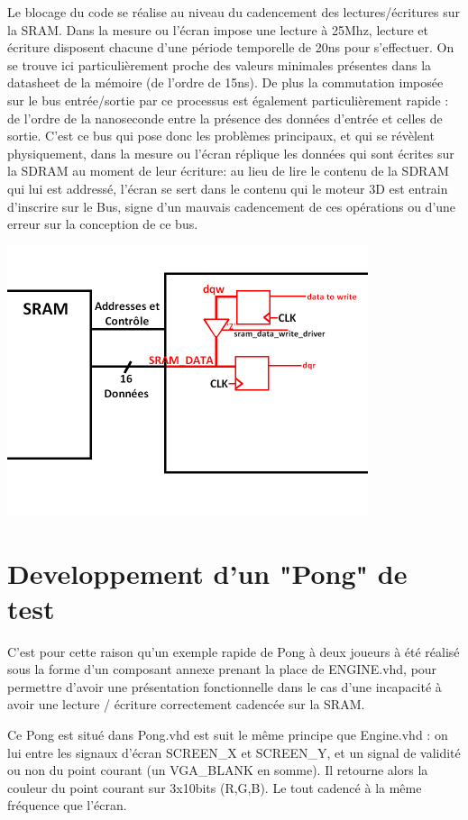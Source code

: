 \documentclass[10pt,a4paper]{report}
\begin{document}
Le blocage du code se réalise au niveau du cadencement des lectures/écritures sur la SRAM. Dans la mesure ou l'écran impose une lecture à 25Mhz, lecture et écriture disposent chacune d'une période temporelle de 20ns pour s'effectuer. On se trouve ici particulièrement proche des valeurs minimales présentes dans la datasheet de la mémoire (de l'ordre de 15ns). De plus la commutation imposée sur le bus entrée/sortie par ce processus est également particulièrement rapide : de l'ordre de la nanoseconde entre la présence des données d'entrée et celles de sortie. C'est ce bus qui pose donc les problèmes principaux, et qui se révèlent physiquement, dans la mesure ou l'écran réplique les données qui sont écrites sur la SDRAM au moment de leur écriture: au lieu de lire le contenu de la SDRAM qui lui est addressé, l'écran se sert dans le contenu qui le moteur 3D est entrain d'inscrire sur le Bus, signe d'un mauvais cadencement de ces opérations ou d'une erreur sur la conception de ce bus.

\begin{center}
\includegraphics[width=300pt]{gfx/sram.png}
\end{center}

\section{Developpement d'un "Pong" de test}

C'est pour cette raison qu'un exemple rapide de Pong à deux joueurs à été réalisé sous la forme d'un composant annexe prenant la place de ENGINE.vhd, pour permettre d'avoir une présentation fonctionnelle dans le cas d'une incapacité à avoir une lecture / écriture correctement cadencée sur la SRAM.

Ce Pong est situé dans Pong.vhd est suit le même principe que Engine.vhd : on lui entre les signaux d'écran SCREEN\_X et SCREEN\_Y, et un signal de validité ou non du point courant (un VGA\_BLANK en somme). Il retourne alors la couleur du point courant sur 3x10bits (R,G,B). Le tout cadencé à la même fréquence que l'écran.
\end{document}
